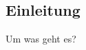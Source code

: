 \documentclass[../../main.tex]{subfiles}
\begin{document}
\subsection{Einleitung}
Um was geht es?
\end{document}
